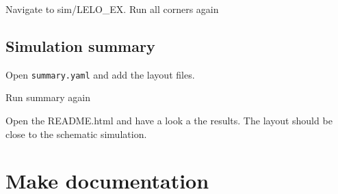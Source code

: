 Navigate to sim/LELO\_EX. Run all corners again

\begin{Shaded}
\begin{Highlighting}[]
\end{Highlighting}
\end{Shaded}

\subsection{Simulation summary}\label{simulation-summary}

Open \texttt{summary.yaml} and add the layout files.

\begin{Shaded}
\begin{Highlighting}[]
\AttributeTok{      }\KeywordTok{{-}}\AttributeTok{ }\KeywordTok{:}
\AttributeTok{        }\KeywordTok{:}
\AttributeTok{        }\KeywordTok{:}
\AttributeTok{      }\KeywordTok{{-}}\AttributeTok{ }\KeywordTok{:}
\AttributeTok{        }\KeywordTok{:}
\AttributeTok{        }\KeywordTok{:}
\AttributeTok{      }\KeywordTok{{-}}\AttributeTok{ }\KeywordTok{:}
\AttributeTok{        }\KeywordTok{:}
\AttributeTok{        }\KeywordTok{:}
\end{Highlighting}
\end{Shaded}

Run summary again

\begin{Shaded}
\begin{Highlighting}[]
 
\end{Highlighting}
\end{Shaded}

Open the README.html and have a look a the results. The layout should be
close to the schematic simulation.

\section{Make documentation}\label{make-documentation}

